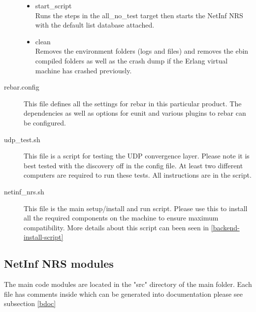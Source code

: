 \begin{description}
\begin{itemize}
\item start\_script \\
Runs the steps in the all\_no\_test target then starts the NetInf NRS with the default list database attached.
\item clean \\
Removes the environment folders (logs and files) and removes the ebin compiled folders as well as the crash dump if the Erlang virtual 
machine has crashed previously.
\end{itemize}
\item[rebar.config]
This file defines all the settings for rebar in this particular product. The dependencies as well as options for eunit and various 
plugins to rebar can be configured.
\item[udp\_test.sh]
This file is a script for testing the UDP convergence layer. Please note it is best tested with the discovery off in the config file. 
At least two different computers are required to run these tests. All instructions are in the script. 
\item[netinf\_nrs.sh]
This file is the main setup/install and run script. Please use this to install all the required components on the machine to ensure 
maximum compatibility. More details about this script can been seen in \ref{backend-install-script}
\end{description}

\subsection {NetInf NRS modules}

The main code modules are located in the "src" directory of the main folder. Each file has comments inside which can be generated into 
documentation please see subsection \ref{bdoc}

